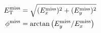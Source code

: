 \begin{align}
  E_{\mathrm{T}}^{\mathrm{miss}} &= \sqrt{ (E^{\mathrm{miss}}_x)^2 + (E^{\mathrm{miss}}_y)^2 } \\
  \phi^{\mathrm{miss}} &= \arctan \left( E^{\mathrm{miss}}_y / E^{\mathrm{miss}}_x \right)
\end{align}



%
